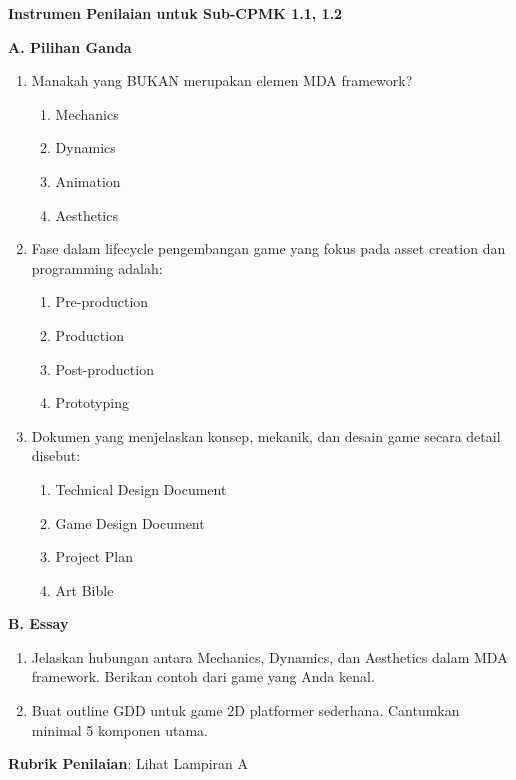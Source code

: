 \documentclass[../main]{subfiles}
\begin{document}
\begin{asesmen}
\textbf{Instrumen Penilaian untuk Sub-CPMK 1.1, 1.2}

\textbf{A. Pilihan Ganda}

\begin{enumerate}
  \item Manakah yang BUKAN merupakan elemen MDA framework?
  \begin{enumerate}
    \item Mechanics
    \item Dynamics
    \item Animation
    \item Aesthetics
  \end{enumerate}
  
  \item Fase dalam lifecycle pengembangan game yang fokus pada asset creation dan programming adalah:
  \begin{enumerate}
    \item Pre-production
    \item Production
    \item Post-production
    \item Prototyping
  \end{enumerate}
  
  \item Dokumen yang menjelaskan konsep, mekanik, dan desain game secara detail disebut:
  \begin{enumerate}
    \item Technical Design Document
    \item Game Design Document
    \item Project Plan
    \item Art Bible
  \end{enumerate}
\end{enumerate}

\textbf{B. Essay}

\begin{enumerate}
  \item Jelaskan hubungan antara Mechanics, Dynamics, dan Aesthetics dalam MDA framework. Berikan contoh dari game yang Anda kenal.
  
  \item Buat outline GDD untuk game 2D platformer sederhana. Cantumkan minimal 5 komponen utama.
\end{enumerate}

\textbf{Rubrik Penilaian}: Lihat Lampiran A
\end{asesmen}
\end{document}
